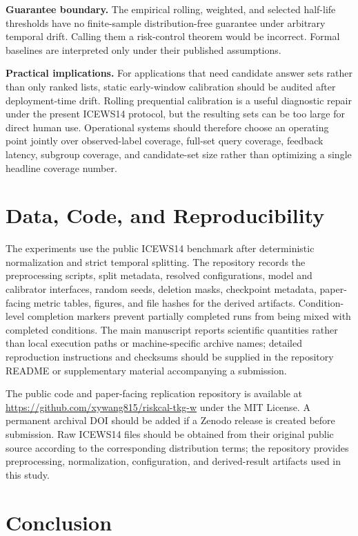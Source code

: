 \documentclass[information,article,submit,oneauthor,pdftex]{Definitions/mdpi}
\begin{document}
\textbf{Guarantee boundary.}
The empirical rolling, weighted, and selected half-life thresholds have no finite-sample
distribution-free guarantee under arbitrary temporal drift. Calling them a
risk-control theorem would be incorrect. Formal baselines are interpreted only
under their published assumptions.

\textbf{Practical implications.}
For applications that need candidate answer sets rather than only ranked lists,
static early-window calibration should be audited after deployment-time drift.
Rolling prequential calibration is a useful diagnostic repair under the present
ICEWS14 protocol, but the resulting sets can be too large for direct human use.
Operational systems should therefore choose an operating point jointly over
observed-label coverage, full-set query coverage, feedback latency, subgroup
coverage, and candidate-set size rather than optimizing a single headline
coverage number.

\section{Data, Code, and Reproducibility}
\label{sec:reproducibility}

The experiments use the public ICEWS14 benchmark after deterministic
normalization and strict temporal splitting. The repository records the
preprocessing scripts, split metadata, resolved configurations, model and
calibrator interfaces, random seeds, deletion masks, checkpoint metadata,
paper-facing metric tables, figures, and file hashes for the derived artifacts.
Condition-level completion markers prevent partially completed runs from being
mixed with completed conditions. The main manuscript reports scientific
quantities rather than local execution paths or machine-specific archive names;
detailed reproduction instructions and checksums should be supplied in the
repository README or supplementary material accompanying a submission.

The public code and paper-facing replication repository is available at
\url{https://github.com/xywang815/riskcal-tkg-w} under the MIT License. A
permanent archival DOI should be added if a Zenodo release is created before
submission. Raw ICEWS14 files should be obtained from their original public
source according to the corresponding distribution terms; the repository
provides preprocessing, normalization, configuration, and derived-result
artifacts used in this study.

\section{Conclusion}
\label{sec:conclusion}
\end{document}
